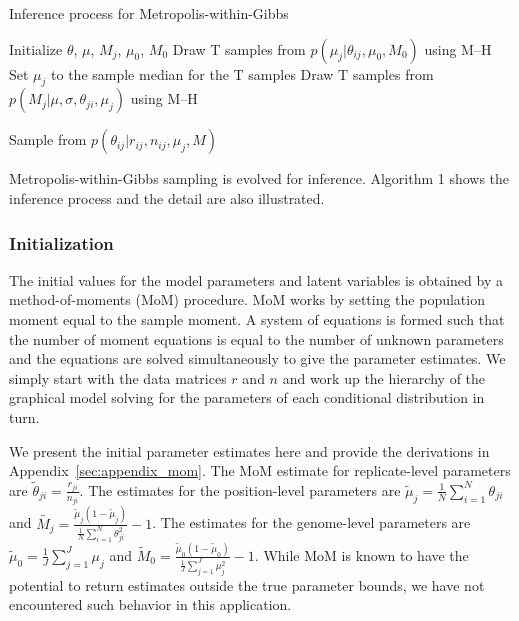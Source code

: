\documentclass[11pt,reqno]{amsart}
\begin{document}
\begin{algorithm}[ht]
\caption{Inference process for Metropolis-within-Gibbs}
\label{alg:metro_gibbs}
\begin{algorithmic}[1]

\State Initialize $\theta$, $\mu$, $M_j$, $\mu_0$, $M_0$
\Repeat
{}
  \State Draw T samples from $p \left( \mu_j |\theta_{ij},\mu_0,M_0\right)$ using M--H 
  \State Set $\mu_j$ to the sample median for the T samples
  \State Draw T samples from $p \left( M_{j} |\mu,\sigma, \theta_{ji},\mu_j\right)$ using M--H 

	\State Sample from $p \left( \theta_{ij} |r_{ij},n_{ij},\mu_j,M \right)$  
  \EndFor

\EndFor
{}
\end{algorithmic}
\end{algorithm}

Metropolis-within-Gibbs sampling is evolved for inference. Algorithm 1 shows the inference process and the detail are also illustrated.

\subsubsection{Initialization}
The initial values for the model parameters and latent variables is obtained by a method-of-moments (MoM) procedure. MoM works by setting the population moment equal to the sample moment. A system of equations is formed such that the number of moment equations is equal to the number of unknown parameters and the equations are solved simultaneously to give the parameter estimates. We simply start with the data matrices $r$ and $n$ and work up the hierarchy of the graphical model solving for the parameters of each conditional distribution in turn.

We present the initial parameter estimates here and provide the derivations in Appendix~\ref{sec:appendix_mom}. The MoM estimate for replicate-level parameters are
$\tilde{\theta}_{ji} = \frac{r_{ji}} {n_{ji}}$.
The estimates for the position-level parameters are
$\tilde{\mu}_j = \frac{1}{N} \sum_{i=1}^N \theta_{ji}$
and
$\tilde{M_j} = \frac{ \tilde{\mu}_j (1 - \tilde{\mu}_j ) } { \frac{1}{N} \sum_{i=1}^N \theta_{ji}^2 } -1$.
The estimates for the genome-level parameters are
$\tilde{\mu}_0 = \frac{1}{J} \sum_{j=1}^J \mu_j$
and
$\tilde{M}_0 = \frac{ \tilde{\mu}_0 (1 - \tilde{\mu}_0 ) } {\frac{1}{J} \sum_{j=1}^J \mu_j^2 } -1$.
While MoM is known to have the potential to return estimates outside the true parameter bounds, we have not encountered such behavior in this application.
\end{document}
